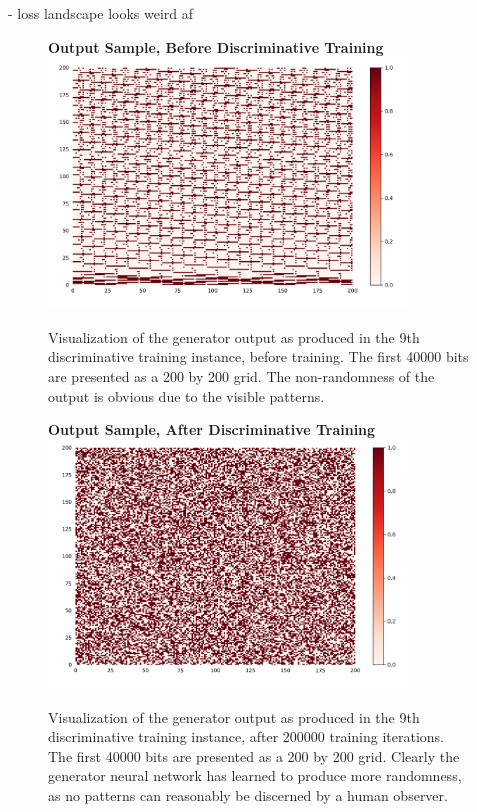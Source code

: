 \documentclass[12pt, titlepage]{report}
\theoremstyle{definition}
\begin{document}
- loss landscape looks weird af

\begin{figure}
    \centering
    \textbf{Output Sample, Before Discriminative Training}
    \includegraphics[width=0.85\textwidth]{img/discriminative_before}\\
    \caption{Visualization of the generator output as produced in the 9th discriminative training instance, before training. The first 40000 bits are presented as a 200 by 200 grid. The non-randomness of the output is obvious due to the visible patterns.}
    \label{figure:visualize_discriminative_before}
    \end{figure}
    
    \begin{figure}
    \centering
    \textbf{Output Sample, After Discriminative Training}
    \includegraphics[width=0.85\textwidth]{img/discriminative_after}\\
    \caption{Visualization of the generator output as produced in the 9th discriminative training instance, after 200000 training iterations. The first 40000 bits are presented as a 200 by 200 grid. Clearly the generator neural network has learned to produce more randomness, as no patterns can reasonably be discerned by a human observer.}
    \label{figure:visualize_discriminative_after}
    \end{figure}
    
\end{document}

